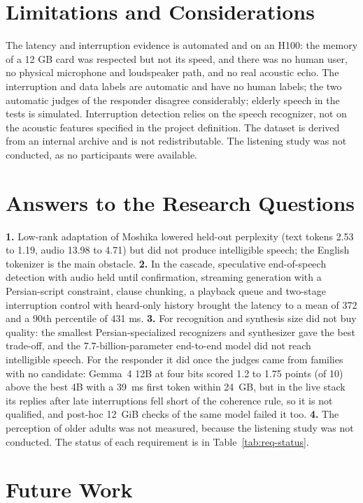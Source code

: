 \section{Limitations and Considerations}

The latency and interruption evidence is automated and on an H100: the memory of
a 12 GB card was respected but not its speed, and there was no human user, no
physical microphone and loudspeaker path, and no real acoustic echo. The
interruption and data labels are automatic and have no human labels; the two
automatic judges of the responder disagree considerably; elderly speech in the
tests is simulated. Interruption detection relies on the speech recognizer, not
on the acoustic features specified in the project definition. The dataset is
derived from an internal archive and is not redistributable. The listening study
was not conducted, as no participants were available.

\section{Answers to the Research Questions}

\textbf{1.} Low-rank adaptation of Moshika lowered held-out perplexity (text
tokens 2.53 to 1.19, audio 13.98 to 4.71) but did not produce intelligible speech;
the English tokenizer is the main obstacle. \textbf{2.} In the cascade,
speculative end-of-speech detection with audio held until confirmation, streaming
generation with a Persian-script constraint, clause chunking, a playback queue and
two-stage interruption control with heard-only history brought the latency to a
mean of 372 and a 90th percentile of 431 ms. \textbf{3.} For recognition and
synthesis size did not buy quality: the smallest Persian-specialized recognizers and
synthesizer gave the best trade-off, and the 7.7-billion-parameter end-to-end model did
not reach intelligible speech. For the responder it did once the judges came from
families with no candidate: Gemma~4 12B at four bits scored 1.2 to 1.75 points (of 10)
above the best 4B with a 39~ms first token within 24~GB, but in the live stack its replies
after late interruptions fell short of the coherence rule, so it is not qualified, and post-hoc
12~GiB checks of the same model failed it too. \textbf{4.} The perception of older adults was not measured,
because the listening study was not conducted. The status of each requirement is in
Table~\ref{tab:req-status}.

\section{Future Work}

